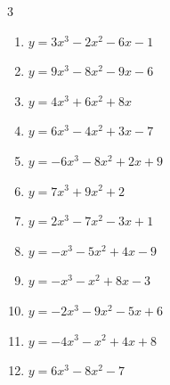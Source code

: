 \begin{multicols}{3}
\begin{enumerate}
  \item $y=3x^{3}-2x^{2}-6x-1$


  \item $y=9x^{3}-8x^{2}-9x-6$


  \item $y=4x^{3}+6x^{2}+8x$


  \item $y=6x^{3}-4x^{2}+3x-7$


\columnbreak %

\resetques

  \item $y=-6x^{3}-8x^{2}+2x+9$


  \item $y=7x^{3}+9x^{2}+2$


  \item $y=2x^{3}-7x^{2}-3x+1$


  \item $y=-x^{3}-5x^{2}+4x-9$


  \item $y=-x^{3}-x^{2}+8x-3$


  \item $y=-2x^{3}-9x^{2}-5x+6$


  \item $y=-4x^{3}-x^{2}+4x+8$


  \item $y=6x^{3}-8x^{2}-7$



\end{enumerate}
\end{multicols}
